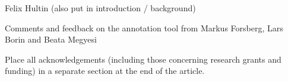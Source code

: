 \documentclass[10pt, a4paper]{article}
\newcommand{\secref}[1]{\StrSubstitute{\getrefnumber{#1}}{.}{ }}
\begin{document}
Felix Hultin \cite{correctAnnotator} (also put in introduction / background)

Comments and feedback on the annotation tool from
Markus Forsberg, Lars Borin and Beata Megyesi

Place all acknowledgements (including those concerning research grants and
funding) in a separate section at the end of the article.

\end{document}

